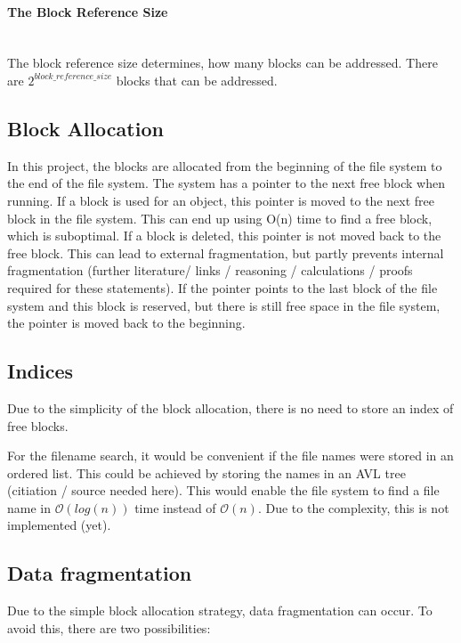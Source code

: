 \documentclass[JCDReport.tex]{subfiles}
\begin{document}
\paragraph{The Block Reference Size} ~\\

\noindent The block reference size determines, how many blocks can be addressed. There are $2^{block\_reference\_size}$ blocks that can be addressed.

\subsection{Block Allocation}

In this project, the blocks are allocated from the beginning of the file system to the end of the file system. The system has a pointer to the next free block when running. If a block is used for an object, this pointer is moved to the next free block in the file system. This can end up using O(n) time to find a free block, which is suboptimal. If a block is deleted, this pointer is not moved back to the free block. This can lead to external fragmentation, but partly prevents internal fragmentation (further literature/ links / reasoning / calculations / proofs required for these statements). If the pointer points to the last block of the file system and this block is reserved, but there is still free space in the file system, the pointer is moved back to the beginning.

\subsection{Indices}

Due to the simplicity of the block allocation, there is no need to store an index of free blocks.

For the filename search, it would be convenient if the file names were stored in an ordered list. This could be achieved by storing the names in an AVL tree (citiation / source needed here). This would enable the file system to
find a file name in $\mathcal{O}(log(n))$ time instead of $\mathcal{O}(n)$. Due to the complexity, this is not implemented (yet).

\subsection{Data fragmentation}

Due to the simple block allocation strategy, data fragmentation can occur. To avoid this, there are two possibilities:
\end{document}
